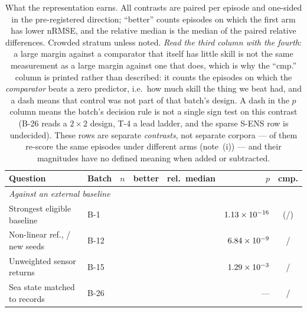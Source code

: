 \documentclass[review]{elsarticle}
\begin{document}
\begin{table}[!htbp]
\centering
\caption{What the representation earns. All contrasts are paired per episode and
one-sided in the pre-registered direction; ``better'' counts episodes on which the
first arm has lower nRMSE, and the relative median is the median of the paired
relative differences. Crowded stratum unless noted. \emph{Read the third column
with the fourth}: a large margin against a comparator that itself has little skill
is not the same measurement as a large margin against one that does, which is why
the ``cmp.'' column is printed rather than described: it counts the episodes on
which the \emph{comparator} beats a zero predictor, i.e.\ how much skill the thing
we beat had, and a dash means that control was not part of that batch's design. A dash in the
$p$ column means the batch's decision rule is not a single sign test on this
contrast (B-26 reads a $2\times2$ design, T-4 a lead ladder, and the sparse S-ENS row
is undecided).
These rows are separate
\emph{contrasts}, not separate corpora --- \HosSameN{} of them re-score the same
\AblationEps{} episodes under different arms (note~(i)) --- and their magnitudes have
no defined meaning when added or subtracted.}
\label{tab:earns}
\footnotesize
\setlength{\tabcolsep}{4pt}
\begin{tabular}{llccrrc}
\toprule
Question & Batch & $n$ & better & rel.\ median & $p$ & cmp. \\
\midrule
\multicolumn{7}{l}{\emph{Against an external baseline}} \\
Strongest eligible baseline & B-1  & \BOneN{}    & \BOneBetter{}    & \BOneRel{}    & $1.13\times 10^{-16}{}$ & (\BOneCmp{}/\BOneCmpN{}) \\
Non-linear ref., \BTwelveFreshSeeds{}/\BTwelveSeeds{} new seeds & B-12 & \BTwelveN{} & \BTwelveBetter{} & \BTwelveRel{} & $6.84\times 10^{-9}{}$ & \BTwelveCmpBetter{}/\BTwelveCmpN{} \\
Unweighted sensor returns & B-15 & \BFifteenN{} & \BFifteenBetter{} & \BFifteenRel{} & $1.29\times 10^{-3}{}$ & \BFifteenCmp{}/\BFifteenN{} \\
Sea state matched to records & B-26 & \BTwentySixN{} & \BTwentySixBetter{} & \BTwentySixRel{} & --- & \BTwentySixCmpBetter{}/\BTwentySixN{} \\

\end{tabular}
\end{table}
\end{document}
